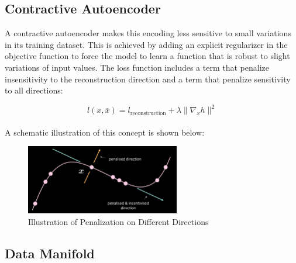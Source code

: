 \subsection{Contractive Autoencoder}

A contractive autoencoder makes this encoding less sensitive to small variations in its training dataset. This is achieved by adding an explicit regularizer in the objective function to force the model to learn a function that is robust to slight variations of input values. The loss function includes a term that penalize insensitivity to the reconstruction direction and a term that penalize sensitivity to all directions:

$$l(x,\bar{x}) = l_{\text{reconstruction}} + \lambda \| \nabla_x h \|^2$$
\\
A schematic illustration of this concept is shown below: 
\\
\begin{figure}[H]
    \centering
    \includegraphics[width=0.6\textwidth]{labs/09/images/Contractive_AutoEncoder.png}
    \caption{Illustration of Penalization on Different Directions}
    \label{fig:Contractive_AutoEncoder}
\end{figure}

\subsection{Data Manifold}

